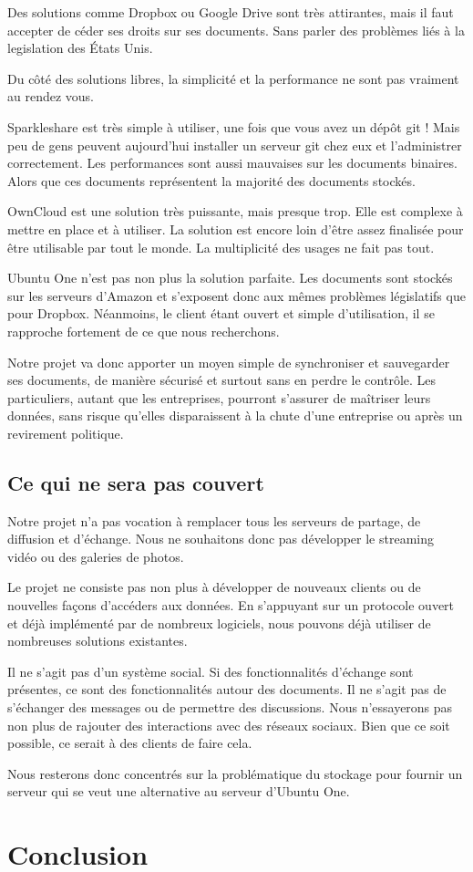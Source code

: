 \documentclass[12pt]{report}
\begin{document}
Des solutions comme Dropbox ou Google Drive sont très attirantes, mais il faut accepter de céder ses droits sur ses documents. Sans parler des problèmes liés à la legislation des États Unis.

Du côté des solutions libres, la simplicité et la performance ne sont pas vraiment au rendez vous.

Sparkleshare est très simple à utiliser, une fois que vous avez un dépôt git ! Mais peu de gens peuvent aujourd'hui installer un serveur git chez eux et l'administrer correctement. Les performances sont aussi mauvaises sur les documents binaires. Alors que ces documents représentent la majorité des documents stockés.

OwnCloud est une solution très puissante, mais presque trop. Elle est complexe à mettre en place et à utiliser. La solution est encore loin d'être assez finalisée pour être utilisable par tout le monde. La multiplicité des usages ne fait pas tout.

Ubuntu One n'est pas non plus la solution parfaite. Les documents sont stockés sur les serveurs d'Amazon et s'exposent donc aux mêmes problèmes législatifs que pour Dropbox. Néanmoins, le client étant ouvert et simple d'utilisation, il se rapproche fortement de ce que nous recherchons.

Notre projet va donc apporter un moyen simple de synchroniser et sauvegarder ses documents, de manière sécurisé et surtout sans en perdre le contrôle. Les particuliers, autant que les entreprises, pourront s'assurer de maîtriser leurs données, sans risque qu'elles disparaissent à la chute d'une entreprise ou après un revirement politique.

\section{Ce qui ne sera pas couvert}

Notre projet n'a pas vocation à remplacer tous les serveurs de partage, de diffusion et d'échange. Nous ne souhaitons donc pas développer le streaming vidéo ou des galeries de photos.

Le projet ne consiste pas non plus à développer de nouveaux clients ou de nouvelles façons d'accéders aux données. En s'appuyant sur un protocole ouvert et déjà implémenté par de nombreux logiciels, nous pouvons déjà utiliser de nombreuses solutions existantes.

Il ne s'agit pas d'un système social. Si des fonctionnalités d'échange sont présentes, ce sont des fonctionnalités autour des documents. Il ne s'agit pas de s'échanger des messages ou de permettre des discussions. Nous n'essayerons pas non plus de rajouter des interactions avec des réseaux sociaux. Bien que ce soit possible, ce serait à des clients de faire cela.

Nous resterons donc concentrés sur la problématique du stockage pour fournir un serveur qui se veut une alternative au serveur d'Ubuntu One.

\chapter{Conclusion}


\end{document}
